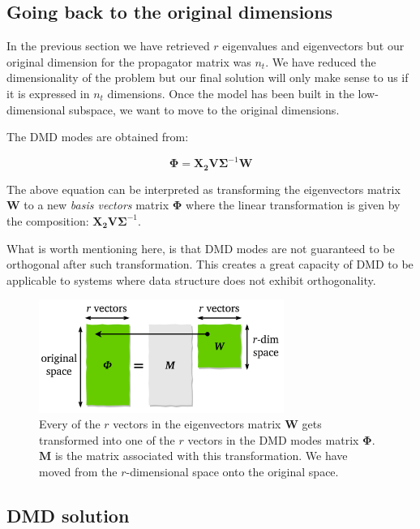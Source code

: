 \documentclass[10pt,twocolumn]{article}
\begin{document}
\subsection{Going back to the original dimensions}

In the previous section we have retrieved $r$ eigenvalues and eigenvectors but our original dimension for the propagator matrix was $n_t$. We have reduced the dimensionality of the problem but our final solution will only make sense to us if it is expressed in $n_t$ dimensions.
Once the model has been built in the low-dimensional subspace, we want to move to the original dimensions. 

The DMD modes are obtained from:

\begin{equation} \label{eq:A_underline}
\bm{\Phi} = \bm{X_2} \bm{V} \bm{\Sigma}^{-1} \bm{W}
\end{equation}

The above equation can be interpreted as transforming the eigenvectors matrix $\bm{W}$ to a new \textit{basis vectors} matrix $\bm{\Phi}$ where the linear transformation is given by the composition: $\bm{X_2} \bm{V} \bm{\Sigma}^{-1}$.

What is worth mentioning here, is that DMD modes are not guaranteed to be orthogonal after such transformation. This creates a great capacity of DMD to be applicable to systems where data structure does not exhibit orthogonality.

\begin{figure}[H]
\centering\includegraphics[width=8cm]{dmd-modes-transformation.png}
\caption{Every of the $r$ vectors in the eigenvectors matrix $\bm{W}$ gets transformed into one of the $r$ vectors in the DMD modes matrix $\bm{\Phi}$. $\bm{M}$ is the matrix associated with this transformation. We have moved from the $r$-dimensional space onto the original space.}
\label{fig:linear_system}
\end{figure}

\subsection{DMD solution}
\end{document}
